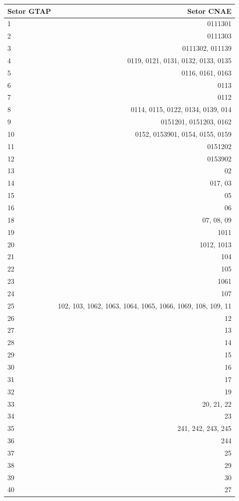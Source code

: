 \documentclass{article}
\begin{document}
\begin{center}
\begin{longtable}{| l | r |}
\hline
\textbf{Setor GTAP} & \textbf{Setor CNAE} \\
\hline
    1 & 0111301 \\
    2 & 0111303 \\
    3 & 0111302, 011139 \\
    4 & 0119, 0121, 0131, 0132, 0133, 0135 \\
    5 & 0116, 0161, 0163 \\
    6 & 0113 \\
    7 & 0112 \\
    8 & 0114, 0115, 0122, 0134, 0139, 014 \\
    9 & 0151201, 0151203, 0162 \\
    10 & 0152, 0153901, 0154, 0155, 0159 \\
    11 & 0151202 \\
    12 & 0153902 \\
    13 & 02 \\
    14 & 017, 03 \\
    15 & 05 \\
    16 & 06 \\
    18 & 07, 08, 09 \\
    19 & 1011 \\
    20 & 1012, 1013 \\
    21 & 104 \\
    22 & 105 \\
    23 & 1061 \\
    24 & 107 \\
    25 & 102, 103, 1062, 1063, 1064, 1065, 1066, 1069, 108, 109, 11 \\
    26 & 12 \\
    27 & 13 \\
    28 & 14 \\
    29 & 15 \\
    30 & 16 \\
    31 & 17 \\
    32 & 19 \\
    33 & 20, 21, 22 \\
    34 & 23 \\
    35 & 241, 242, 243, 245 \\
    36 & 244 \\
    37 & 25 \\
    38 & 29 \\
    39 & 30 \\
    40 & 27 \\

\end{longtable}
\end{center}
\end{document}
